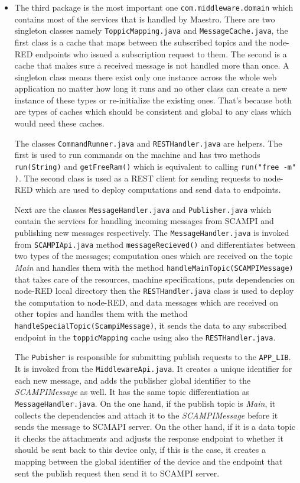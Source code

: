 \begin{itemize}
 
 \item The third package is the most important one \verb|com.middleware.domain| which contains most of the services that is handled by Maestro. There are two singleton classes namely \verb|ToppicMapping.java| and \verb|MessageCache.java|, the first class is a cache that maps between the subscribed topics and the node-RED endpoints who issued a subscription request to them. The second is a cache that makes sure a received message is not handled more than once. A singleton class means there exist only one instance across the whole web application no matter how long it runs and no other class can create a new instance of these types or re-initialize the existing ones. That's because both are types of caches which should be consistent and global to any class which would need these caches. 
 
 The classes \verb|CommandRunner.java| and \verb|RESTHandler.java| are helpers. The first is used to run commands on the machine and  has two methods \verb|run(String)| and \verb|getFreeRam()| which is equivalent to calling \verb|run("free -m" )|. The second class is used as a REST client for sending requests to node-RED which are used to deploy computations and  send data to endpoints.
 
  Next are the classes \verb|MessageHandler.java| and \verb|Publisher.java| which contain the services for handling incoming messages from SCAMPI and publishing new messages respectively. The \verb|MessageHandler.java| is invoked from  \verb|SCAMPIApi.java| method \verb|messageRecieved()| and differentiates between two types of the messages; computation ones which are received on the topic \textit{Main} and handles them with the method \verb|handleMainTopic(SCAMPIMessage)| that takes care of the resources, machine specifications, puts dependencies on node-RED local directory then the \verb|RESTHandler.java| class is used to deploy the computation to node-RED, and data messages which are received on other topics and handles them with the method \verb|handleSpecialTopic(ScampiMessage)|, it sends the data to any subscribed endpoint in the \verb|toppicMapping| cache using also the \verb|RESTHandler.java|.
 
 The \verb|Pubisher| is responsible for submitting publish requests to the \verb|APP_LIB|. It is invoked from the \verb|MiddlewareApi.java|.  It creates a unique identifier for each new message, and adds the publisher global identifier to the \textit{SCAMPIMessage} as well. It has the same topic differentiation as \verb|MessageHandler.java|.
 On the one hand, if the publish topic is \textit{Main}, it collects the dependencies and attach it to the \textit{SCAMPIMessage} before it sends the message to SCMAPI server. On the other hand, if it is a data topic it checks the attachments and adjusts the response endpoint  to whether it should be sent back to this device only, if this is the case, it creates a mapping between the global identifier of the device and the endpoint that sent the publish request then send it to SCAMPI server. \\
 

\end{itemize}

